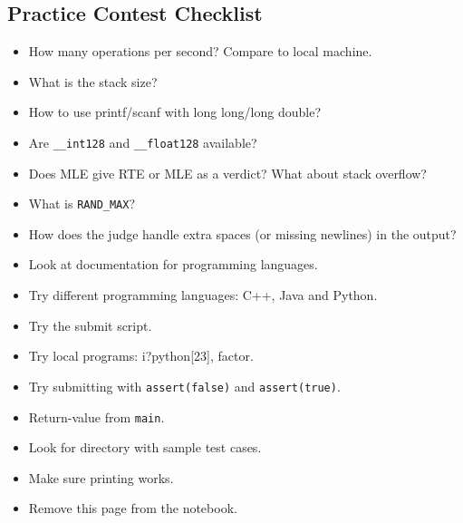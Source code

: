 \documentclass[8pt,a4paper,landscape,oneside]{amsart}
\begin{document}
\begin{multicols*}{3}
    \clearpage
    \section*{Practice Contest Checklist}
        \begin{itemize}
            \item How many operations per second? Compare to local machine.
            \item What is the stack size?
            \item How to use printf/scanf with long long/long double?
            \item Are \texttt{\_{}\_{}int128} and \texttt{\_{}\_{}float128} available?
            \item Does MLE give RTE or MLE as a verdict? What about stack overflow?
            \item What is \texttt{RAND\_{}MAX}?
            \item How does the judge handle extra spaces (or missing newlines) in the output?
            \item Look at documentation for programming languages.
            \item Try different programming languages: C++, Java and Python.
            \item Try the submit script.
            \item Try local programs: i?python[23], factor.
            \item Try submitting with \texttt{assert(false)} and \texttt{assert(true)}.
            \item Return-value from \texttt{main}.
            \item Look for directory with sample test cases.
            \item Make sure printing works.

            \item Remove this page from the notebook.
        \end{itemize}
\end{multicols*}
\end{document}
